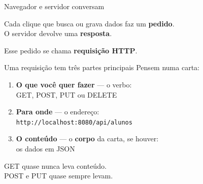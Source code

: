 \documentclass[aspectratio=169,11pt]{beamer}
\begin{document}
\begin{frame}{Navegador e servidor conversam}
  \begin{center}
  \end{center}

  \vspace{0.9em}
  Cada clique que busca ou grava dados faz um \textbf{pedido}.\\
  O servidor devolve uma \textbf{resposta}.

  \vspace{0.4em}
  Esse pedido se chama \textbf{requisição HTTP}.
\end{frame}

\begin{frame}{Uma requisição tem três partes principais}
  Pensem numa carta:

  \vspace{0.5em}
  \begin{enumerate}
    \item \textbf{O que você quer fazer} --- o verbo:\\
          GET, POST, PUT ou DELETE
    \item \textbf{Para onde} --- o endereço:\\
          \texttt{http://localhost:8080/api/alunos}
    \item \textbf{O conteúdo} --- o \textbf{corpo} da carta, se houver:\\
          os dados em JSON
  \end{enumerate}

  \vspace{0.6em}
  GET quase nunca leva conteúdo.\\
  POST e PUT quase sempre levam.
\end{frame}
\end{document}
